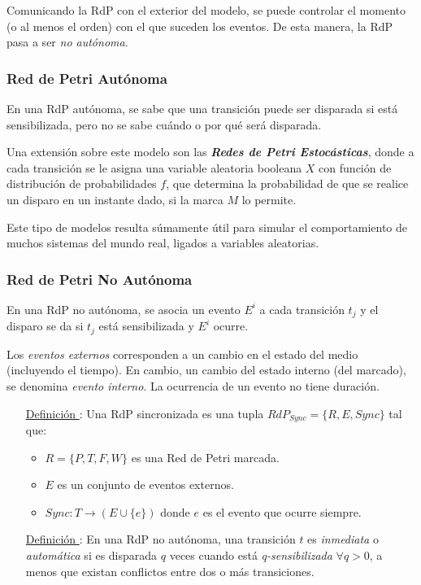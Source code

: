 Comunicando la RdP con el exterior del modelo, se puede controlar el momento (o
al menos el orden) con el que suceden los eventos. De esta manera, la RdP pasa a
ser \textit{no autónoma}.

\subsubsection{Red de Petri Autónoma}

En una RdP autónoma, se sabe que una transición puede ser disparada si está
sensibilizada, pero no se sabe cuándo o por qué será disparada.

Una extensión sobre este modelo son las \textit{\textbf{Redes de Petri
Estocásticas}}, donde a cada transición se le asigna una variable aleatoria
booleana $X$ con función de distribución de probabilidades $f$, que determina la
probabilidad de que se realice un disparo en un instante dado, si la marca $M$ lo permite.

Este tipo de modelos resulta súmamente útil para simular el comportamiento de
muchos sistemas del mundo real, ligados a variables aleatorias.

\subsubsection{Red de Petri No Autónoma}
En una RdP no autónoma, se asocia un evento $E^{i}$ a cada transición $t_{j}$ y
el disparo se da si $t_{j}$ está sensibilizada y $E^{i}$ ocurre.

Los \textit{eventos externos} corresponden a un cambio en el estado del medio
(incluyendo el tiempo). En cambio, un cambio del estado interno (del marcado),
se denomina \textit{evento interno}. La ocurrencia de un evento no tiene
duración. \cite{Hybrid_petri_nets}

\begin{itemize}
  \item [\underline{Definición \thedefinitionsCounter}:] Una RdP sincronizada es una tupla
  $RdP_{Sync} = \{R, E, Sync\}$ tal que:
  \begin{itemize}
    \item $R =  \{P,T,F,W\}$ es una Red de Petri marcada.
    \item $E$ es un conjunto de eventos externos.
    \item $Sync : T \rightarrow (E \cup \{e\} ) $ donde $e$ es el evento
    que ocurre siempre.
  \end{itemize}
  \item [\underline{Definición \thedefinitionsCounter}:] En una RdP no autónoma, una transición $t$
   es \textit{inmediata} o \textit{automática} si es disparada $q$ veces cuando
   está \textit{q-sensibilizada} $\forall q > 0$, a menos que existan conflictos
   entre dos o más transiciones.
\end{itemize}

